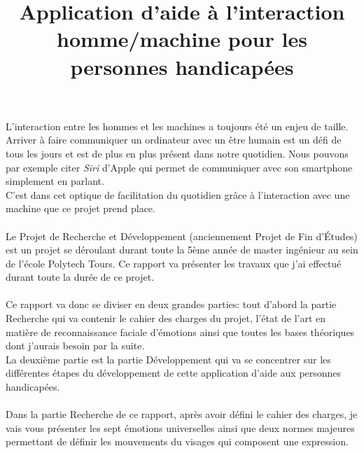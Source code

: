 \documentclass[poster]{polytech/polytech}
\title{Application d'aide à l'interaction homme/machine pour les personnes handicapées}
\begin{document}
\maketitle


L'interaction entre les hommes et les machines a toujours été un enjeu de taille. Arriver à faire communiquer un ordinateur avec un être humain est un défi de tous les jours et est de plus en plus présent dans notre quotidien. Nous pouvons par exemple citer \textit{Siri} d'Apple qui permet de communiquer avec son smartphone simplement en parlant.\\ 
C'est dans cet optique de facilitation du quotidien grâce à l'interaction avec une machine que ce projet prend place.\\
\\
Le Projet de Recherche et Développement (anciennement Projet de Fin d'Études) est un projet se déroulant durant toute la 5ème année de master ingénieur au sein de l'école Polytech Tours. Ce rapport va présenter les travaux que j'ai effectué durant toute la durée de ce projet.\\
\\
Ce rapport va donc se diviser en deux grandes parties: tout d'abord la partie Recherche qui va contenir le cahier des charges du projet, l'état de l'art en matière de reconnaissance faciale d'émotions ainsi que toutes les bases théoriques dont j'aurais besoin par la suite.\\
La deuxième partie est la partie Développement qui va se concentrer sur les différentes étapes du développement de cette application d'aide aux personnes handicapées.\\
\\
Dans la partie Recherche de ce rapport, après avoir défini le cahier des charges, je vais vous présenter les sept émotions universelles ainsi que deux normes majeures permettant de définir les mouvements du visages qui composent une expression.\\
\end{document}
